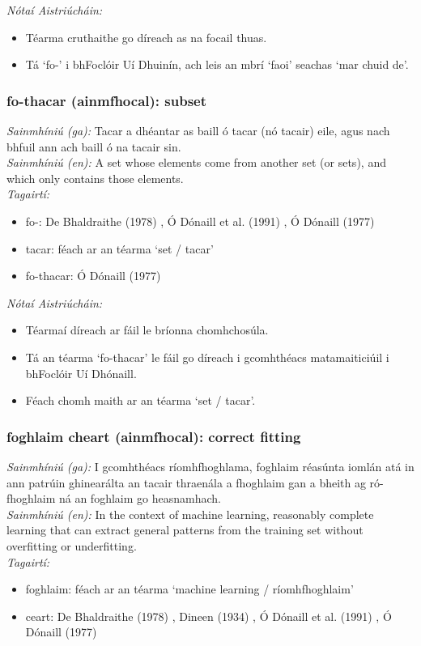 \documentclass{article}
\begin{document}
 \noindent \textit{Nótaí Aistriúcháin:}
\begin{itemize}
	\item Téarma cruthaithe go díreach as na focail thuas.
	\item Tá `fo-' i bhFoclóir Uí Dhuinín, ach leis an mbrí `faoi' seachas `mar chuid de'.
\end{itemize}


\subsubsection*{fo-thacar (ainmfhocal): subset}
 \noindent \textit{Sainmhíniú (ga):} Tacar a dhéantar as baill ó tacar (nó tacair) eile, agus nach bhfuil ann ach baill ó na tacair sin.
\\
 \noindent \textit{Sainmhíniú (en):} A set whose elements come from another set (or sets), and which only contains those elements.
\\
 \noindent \textit{Tagairtí:}
\begin{itemize}
	\item fo-: De Bhaldraithe (1978) \cite{de-bhaldraithe}, Ó Dónaill et al. (1991) \cite{focloir-beag}, Ó Dónaill (1977) \cite{odonaill}
	\item tacar: féach ar an téarma `set / tacar'
	\item fo-thacar: Ó Dónaill (1977) \cite{odonaill}
\end{itemize}

 \noindent \textit{Nótaí Aistriúcháin:}
\begin{itemize}
	\item Téarmaí díreach ar fáil le bríonna chomhchosúla.
	\item Tá an téarma `fo-thacar' le fáil go díreach i gcomhthéacs matamaiticiúil i bhFoclóir Uí Dhónaill.
	\item Féach chomh maith ar an téarma `set / tacar'.
\end{itemize}


\subsubsection*{foghlaim cheart (ainmfhocal): correct fitting}
 \noindent \textit{Sainmhíniú (ga):} I gcomhthéacs ríomhfhoghlama, foghlaim réasúnta iomlán atá in ann patrúin ghinearálta an tacair thraenála a fhoghlaim gan a bheith ag ró-fhoghlaim ná an foghlaim go heasnamhach.
\\
 \noindent \textit{Sainmhíniú (en):} In the context of machine learning, reasonably complete learning that can extract general patterns from the training set without overfitting or underfitting.
\\
 \noindent \textit{Tagairtí:}
\begin{itemize}
	\item foghlaim: féach ar an téarma `machine learning / ríomhfhoghlaim'
	\item ceart: De Bhaldraithe (1978) \cite{de-bhaldraithe}, Dineen (1934) \cite{dineen}, Ó Dónaill et al. (1991) \cite{focloir-beag}, Ó Dónaill (1977) \cite{odonaill}
\end{itemize}
\end{document}
